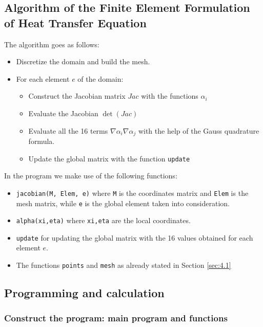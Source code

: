 \subsection{Algorithm of the Finite Element Formulation of Heat Transfer Equation}
The algorithm goes as follows:
\begin{itemize}
	\item Discretize the domain and build the mesh.
	\item For each element $ e $ of the domain:
	\begin{itemize}
		\item Construct the Jacobian matrix $ Jac $ with the functions $ \alpha_i $
		\item Evaluate the Jacobian $ \det(Jac) $
		\item Evaluate all the 16 terms $ \nabla\alpha_i\nabla\alpha_j $ with the help of the Gauss quadrature formula.
		\item Update the global matrix with the function \texttt{update}
	\end{itemize}
\end{itemize}

In the program we make use of the following functions:
\begin{itemize}
	\item \texttt{jacobian(M, Elem, e)} where \texttt{M} is the coordinates matrix and \texttt{Elem} is the mesh matrix, while \texttt{e} is the global element taken into consideration.
	\item \texttt{alpha(xi,eta)} where \texttt{xi,eta} are the local coordinates.
	\item \texttt{update} for updating the global matrix with the 16 values obtained for each element $ e $. 
	\item The functions \texttt{points} and \texttt{mesh} as already stated in Section \ref{sec:4.1} 
\end{itemize}



\subsection{Programming and calculation}
\subsubsection{Construct the program: main program and functions}


